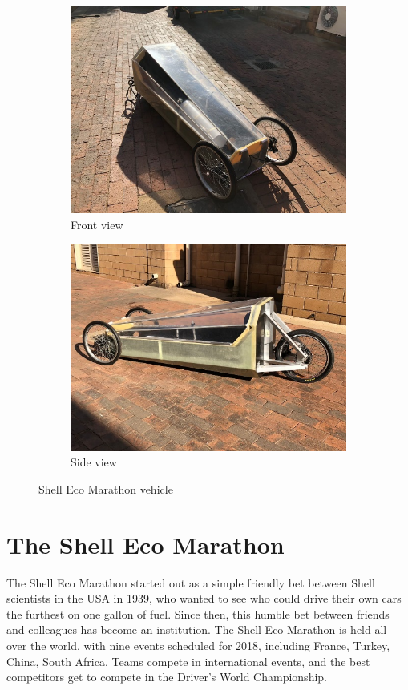 \documentclass[a4paper, 12pt]{article}
\begin{document}
		\begin{figure}[H]
			\begin{subfigure}{0.5\textwidth}
				\includegraphics{img/front_view.jpg}
				\caption{Front view}
			\end{subfigure}
			\begin{subfigure}{0.5\textwidth}
				\includegraphics{img/side_view.jpg}
				\caption{Side view}
			\end{subfigure}
			\caption{Shell Eco Marathon vehicle}
		\end{figure}
	\newpage
	\section{The Shell Eco Marathon} %
	\label{sec:the_shell_eco_marathon}
		The Shell Eco Marathon started out as a simple friendly bet between Shell scientists in the USA in 1939, who wanted to see who could drive their own cars the furthest on one gallon of fuel. Since then, this humble bet between friends and colleagues has become an institution. The Shell Eco Marathon is held all over the world, with nine events scheduled for 2018, including France, Turkey, China, South Africa. Teams compete in international events, and the best competitors get to compete in the Driver's World Championship.
\end{document}
